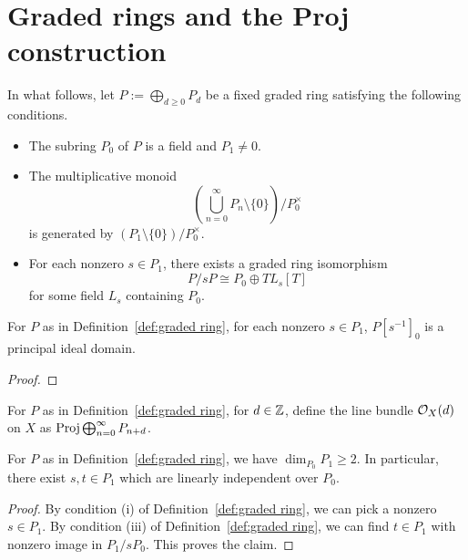 \section{Graded rings and the Proj construction}

\begin{definition} \label{def:graded ring}
In what follows, let $P := \bigoplus_{d \geq 0} P_d$ be a fixed graded ring satisfying the following conditions.

\begin{itemize}
\item[(i)]
The subring $P_0$ of $P$ is a field and $P_1 \neq 0$.
\item[(ii)]
The multiplicative monoid 
\[
\left( \bigcup_{n=0}^\infty P_n \setminus \{0\} \right)/P_0^\times
\]
is generated by $(P_1 \setminus \{0\})/P_{0}^{\times}$.
\item[(iii)]
For each nonzero $s \in P_1$, there exists a graded ring isomorphism 
\begin{equation} \label{eq:graded ring isom mod s}
P/sP \cong P_0 \oplus T L_s[T]
\end{equation}
for some field $L_s$ containing $P_0$. 
\end{itemize}

\end{definition}

\begin{lemma} \label{prop:PID from graded ring}
For $P$ as in Definition~\ref{def:graded ring}, for each nonzero $s \in P_1$, $P[s^{-1}]_0$
is a principal ideal domain. 
\end{lemma}
\begin{proof}
\end{proof}

\begin{definition} \label{def:line bundles}
For $P$ as in Definition~\ref{def:graded ring},
for $d \in \mathbb{Z}$, define the line bundle $\mathcal{O}_X(d)$ on $X$ as $\operatorname{Proj} \bigoplus_{n=0}^\infty P_{n+d}$.
\end{definition}

\begin{lemma} \label{lem:dimension at least 2}
For $P$ as in Definition~\ref{def:graded ring}, we have $\dim_{P_0} P_1 \geq 2$.
In particular, there exist $s,t \in P_1$ which are linearly independent over $P_0$.
\end{lemma}
\begin{proof}
By condition (i) of Definition~\ref{def:graded ring},
we can pick a nonzero $s \in P_1$.
By condition (iii) of Definition~\ref{def:graded ring}, we can find $t \in P_1$ 
with nonzero image in $P_1/sP_0$. This proves the claim.
\end{proof}

